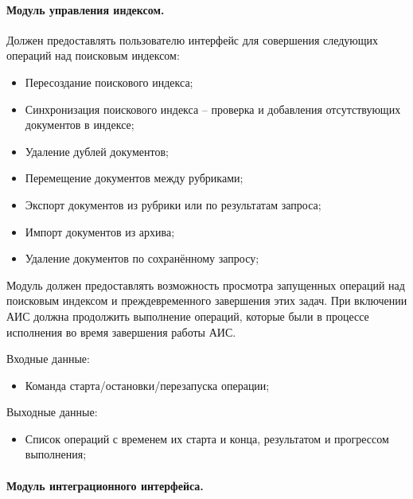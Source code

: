 \paragraph{Модуль управления индексом.}
Должен предоставлять пользователю интерфейс для совершения следующих
операций над поисковым индексом:
\begin{itemize}
\item Пересоздание поискового индекса;
\item Синхронизация поискового индекса -- проверка и добавления отсутствующих документов в индексе;
\item Удаление дублей документов;
\item Перемещение документов между рубриками; 
\item Экспорт документов из рубрики или по результатам запроса;
\item Импорт документов из архива;
\item Удаление документов по сохранённому запросу;
\end{itemize}

Модуль должен предоставлять возможность просмотра запущенных операций над поисковым индексом и преждевременного завершения этих задач. При включении АИС должна продолжить выполнение операций, которые были в процессе исполнения во время завершения работы АИС.

Входные данные:
\begin{itemize}
\item Команда старта/остановки/перезапуска операции;
\end{itemize}

Выходные данные:
\begin{itemize}
\item Список операций с временем их старта и конца, результатом и прогрессом выполнения;
\end{itemize}

\paragraph{Модуль интеграционного интерфейса.}

